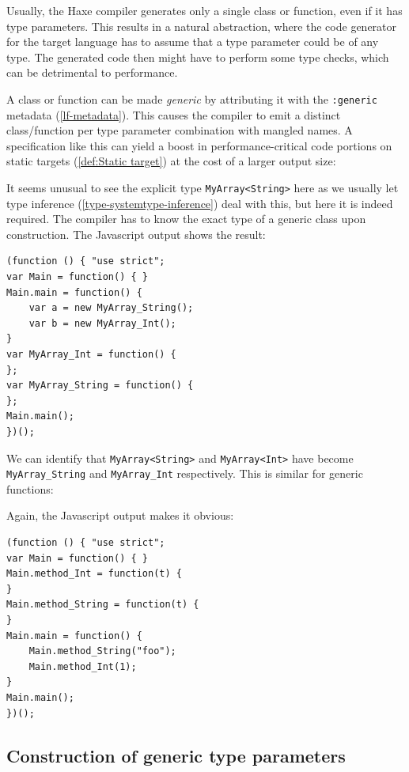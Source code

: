 \documentclass[a4paper,oneside]{book}
\newcommand{\target}[1]{#1}
\newcommand{\type}[1]{\texttt{#1}}
\newcommand{\expr}[1]{\texttt{#1}}
\newcommand{\tref}[2]{#1 (\ref{#2})}
\newcommand{\haxe}[2][]{%
}
\begin{document}
Usually, the Haxe compiler generates only a single class or function, even if it has type parameters. This results in a natural abstraction, where the code generator for the target language has to assume that a type parameter could be of any type. The generated code then might have to perform some type checks, which can be detrimental to performance.

A class or function can be made \emph{generic} by attributing it with the \expr{:generic} \tref{metadata}{lf-metadata}. This causes the compiler to emit a distinct class/function per type parameter combination with mangled names. A specification like this can yield a boost in performance-critical code portions on \tref{static targets}{def:Static target} at the cost of a larger output size:

\haxe{assets/GenericClass.hx}

It seems unusual to see the explicit type \type{MyArray<String>} here as we usually let \tref{type inference}{type-systemtype-inference} deal with this, but here it is indeed required. The compiler has to know the exact type of a generic class upon construction. The \target{Javascript} output shows the result:

\begin{lstlisting}
(function () { "use strict";
var Main = function() { }
Main.main = function() {
	var a = new MyArray_String();
	var b = new MyArray_Int();
}
var MyArray_Int = function() {
};
var MyArray_String = function() {
};
Main.main();
})();
\end{lstlisting}

We can identify that \type{MyArray<String>} and \type{MyArray<Int>} have become \type{MyArray_String} and \type{MyArray_Int} respectively. This is similar for generic functions:

\haxe{assets/GenericFunction.hx}

Again, the \target{Javascript} output makes it obvious:

\begin{lstlisting}
(function () { "use strict";
var Main = function() { }
Main.method_Int = function(t) {
}
Main.method_String = function(t) {
}
Main.main = function() {
	Main.method_String("foo");
	Main.method_Int(1);
}
Main.main();
})();
\end{lstlisting}


\subsection{Construction of generic type parameters}
\label{type-systemgeneric-type-parameter-construction}
\end{document}
